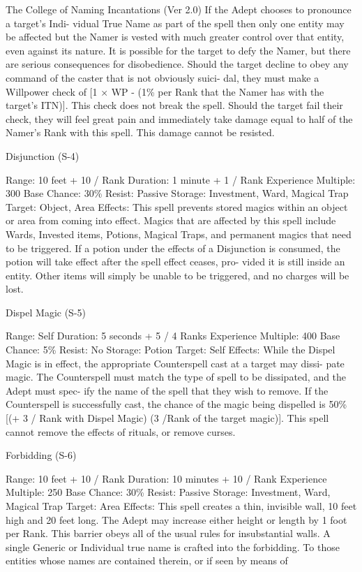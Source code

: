 \begin{Chapter}{The College of Naming Incantations (Ver 2.0)}
If  the  Adept  chooses  to  pronounce  a  target’s  Indi-
vidual True Name as part of the spell then only one 
entity may be affected but the Namer is vested with 
much greater control over that entity, even against 
its  nature.  It  is  possible  for  the  target  to  defy  the 
Namer,  but  there  are  serious  consequences  for 
disobedience. Should the target decline to obey any 
command  of the  caster  that  is  not  obviously  suici-
dal, they must make a Willpower check of [1 × WP 
- (1\% per Rank that the Namer has with the target’s 
ITN)]. This check does not break the spell. Should 
the target fail their check, they will feel great pain 
and  immediately  take  damage  equal  to  half  of  the 
Namer’s Rank with this spell. This damage cannot 
be resisted. 

Disjunction (S-4) 

Range: 10 feet + 10 / Rank 
Duration: 1 minute + 1 / Rank 
Experience Multiple: 300 
Base Chance: 30\% 
Resist: Passive 
Storage: Investment, Ward, Magical Trap 
Target: Object, Area 
Effects: This spell prevents stored magics within an 
object or area from coming into effect. Magics that 
are  affected  by  this  spell  include  Wards,  Invested 
items,  Potions,  Magical  Traps,  and  permanent 
magics that need to be triggered.  If a potion under 
the effects of a Disjunction is consumed, the potion 
will  take  effect  after  the  spell  effect  ceases,  pro-
vided  it  is  still  inside  an  entity.  Other  items  will 
simply  be  unable  to  be  triggered,  and  no  charges 
will be lost. 

Dispel Magic (S-5) 

Range: Self 
Duration: 5 seconds + 5 / 4 Ranks 
Experience Multiple: 400 
Base Chance: 5\% 
Resist: No 
Storage: Potion 
Target: Self 
Effects:  While  the  Dispel  Magic  is  in  effect,  the 
appropriate Counterspell cast at a target may dissi-
pate magic. The Counterspell must match the  type 
of spell to be dissipated, and the Adept must spec-
ify the name of the spell that they wish to remove. 
If the Counterspell is successfully cast, the chance 
of  the  magic  being  dispelled  is  50\%  [(+  3  /  Rank 
with Dispel Magic) (3 /Rank of the target magic)]. 
This  spell  cannot  remove  the  effects  of  rituals,  or 
remove curses. 

Forbidding (S-6) 

Range: 10 feet + 10 / Rank 
Duration: 10 minutes + 10 / Rank 
Experience Multiple: 250 
Base Chance: 30\% 
Resist: Passive 
Storage: Investment, Ward, Magical Trap 
Target: Area 
Effects: This spell creates a thin, invisible wall, 10 
feet high and 20 feet long. The Adept may increase 
either  height  or  length  by  1  foot  per  Rank.  This 
barrier obeys all of the usual rules for insubstantial 
walls.  A  single  Generic  or  Individual  true name  is 
crafted into the forbidding. To those entities whose 
names are contained therein, or if seen by means of 


\end{Chapter}
